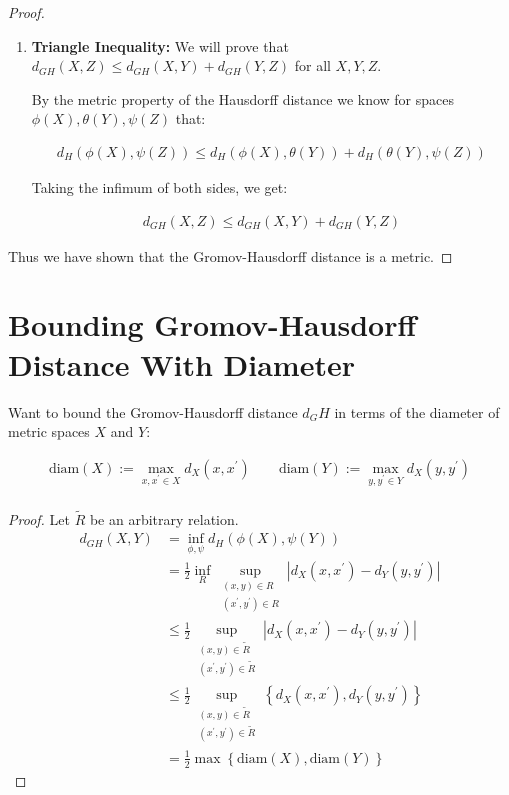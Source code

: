 \documentclass{article}
\begin{document}
\begin{proof}
\begin{enumerate}
        \item \textbf{Triangle Inequality:} We will prove that $d_{GH}(X,Z) \leq d_{GH}(X,Y) + d_{GH}(Y,Z)$ for all $X,Y,Z$.
        
       By the metric property of the Hausdorff distance we know for spaces $\phi(X), \theta(Y), \psi(Z)$ that:

       \begin{align*}
            d_H(\phi(X), \psi(Z)) \leq d_H(\phi(X), \theta(Y)) + d_H(\theta(Y), \psi(Z))
       \end{align*}

       Taking the infimum of both sides, we get:

       \begin{align*}
            d_{GH}(X,Z) \leq d_{GH}(X,Y) + d_{GH}(Y,Z)
       \end{align*}
    \end{enumerate}

    Thus we have shown that the Gromov-Hausdorff distance is a metric.
    \end{proof}

\section{Bounding Gromov-Hausdorff Distance With Diameter}

    Want to bound the Gromov-Hausdorff distance $d_GH$ in terms of the diameter of metric spaces $X$ and $Y$:

    \begin{align*}
        \textrm{diam}(X) := \max_{x,x^\prime \in X} d_X(x,x^\prime) \qquad \textrm{diam}(Y) := \max_{y,y^\prime \in Y} d_X(y,y^\prime) \\
    \end{align*}

    \begin{proof}
        Let $\tilde{R}$ be an arbitrary relation.
    \begin{align*}
        d_{GH}(X,Y) &= \inf_{\phi, \psi} d_H(\phi(X), \psi(Y)) \\
        &= \frac{1}{2} \inf_R \sup_{\substack{(x,y) \in R \\ (x^\prime, y^\prime) \in R}} |d_X(x, x^\prime) - d_Y(y, y^\prime) | \\
        & \leq \frac{1}{2} \sup_{\substack{(x,y) \in \tilde{R} \\ (x^\prime, y^\prime) \in \tilde{R}}} |d_X(x, x^\prime) - d_Y(y, y^\prime) |  \\
        &\leq \frac{1}{2} \sup_{\substack{(x,y) \in \tilde{R} \\ (x^\prime, y^\prime) \in \tilde{R}}} \left\{ d_X(x,x^\prime), d_Y(y, y^\prime) \right\} \\
        &= \frac{1}{2} \max \left\{ \textrm{diam}(X), \textrm{diam}(Y) \right\}
    \end{align*}
    \end{proof}
\end{document}
